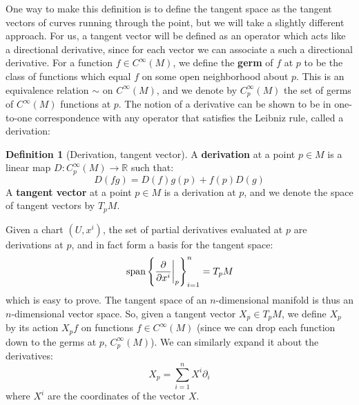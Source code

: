 \documentclass[11pt, oneside]{article}   	%
\theoremstyle{definition}
\newtheorem{definition}{Definition}[section]
\begin{document}
One way to make this definition is to define the tangent space as the tangent vectors of curves running through the point, but 
we will take a slightly different approach. For us, a tangent vector will be defined as an operator which acts like a directional 
derivative, since for each vector we can associate a such a directional derivative. For a function $f\in C^\infty(M)$, we define 
the \textbf{germ} of $f$ at $p$ to be the class of functions which equal $f$ on some open neighborhood about $p$. This is 
an equivalence relation $\sim$ on $C^\infty(M)$, and we denote by $C_p^\infty(M)$ the set of germs of $C^\infty(M)$ functions 
at $p$. The notion of a derivative can be shown to be in one-to-one correspondence with any operator that satisfies the 
Leibniz rule, called a derivation:
\begin{definition}[Derivation, tangent vector]
	A \textbf{derivation} at a point $p\in M$ is a linear map $D : C_p^\infty(M)\rightarrow\mathbb R$ such that:
	\begin{equation}
		D(fg) = D(f) g(p) + f(p) D(g)
	\end{equation}
	A \textbf{tangent vector} at a point $p\in M$ is a derivation at $p$, and we denote the space of tangent vectors by 
	$T_pM$. 
\end{definition}

Given a chart $(U, x^i)$, the set of partial derivatives evaluated at $p$ are derivations at $p$, and in fact form a basis for the tangent space:
\begin{equation}
	\textnormal{span}\left\{\frac{\partial}{\partial x^i}\bigg|_p\right\}_{i = 1}^n = T_p M
\end{equation}
which is easy to prove. The tangent space of an $n$-dimensional manifold is thus an $n$-dimensional vector space. So, given 
a tangent vector $X_p\in T_p M$, we define $X_p$ by its action $X_p f$ on functions $f\in C^\infty(M)$ (since we can drop 
each function down to the germs at $p$, $C_p^\infty(M)$). We can similarly expand it about the derivatives:
\begin{equation}
	X_p = \sum_{i = 1}^n X^i\partial_i
\end{equation}
where $X^i$ are the coordinates of the vector $X$. 
\end{document}
